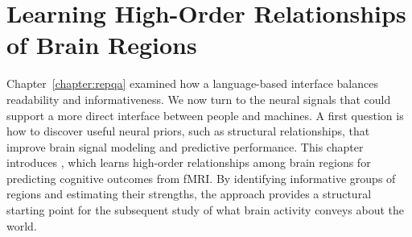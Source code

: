 \chapter{Learning High-Order Relationships of Brain Regions}
\label{chapter:hybrid}

Chapter~\ref{chapter:repqa} examined how a language-based interface balances readability and informativeness. We now turn to the neural signals that could support a more direct interface between people and machines. A first question is how to discover useful neural priors, such as structural relationships, that improve brain signal modeling and predictive performance. This chapter introduces \hybrid{}, which learns high-order relationships among brain regions for predicting cognitive outcomes from fMRI. By identifying informative groups of regions and estimating their strengths, the approach provides a structural starting point for the subsequent study of what brain activity conveys about the world.









